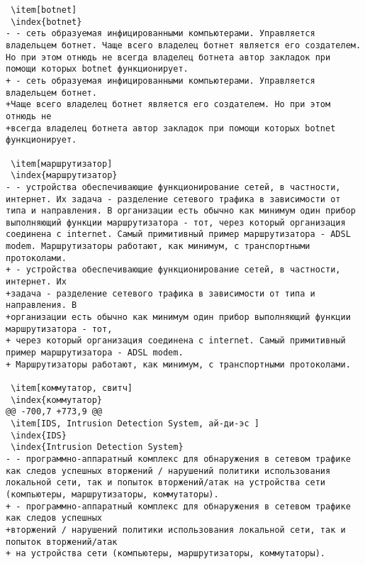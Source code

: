 \begin{verbatim}
 \item[botnet]
 \index{botnet}
- - сеть образуемая инфицированными компьютерами. Управляется владельцем ботнет. Чаще всего владелец ботнет является его создателем. Но при этом отнюдь не всегда владелец ботнета автор закладок при помощи которых botnet функционирует.
+ - сеть образуемая инфицированными компьютерами. Управляется владельцем ботнет.
+Чаще всего владелец ботнет является его создателем. Но при этом отнюдь не
+всегда владелец ботнета автор закладок при помощи которых botnet функционирует.

 \item[маршрутизатор]
 \index{маршрутизатор}
- - устройства обеспечивающие функционирование сетей, в частности, интернет. Их задача - разделение сетевого трафика в зависимости от типа и направления. В организации есть обычно как минимум один прибор выполняющий функции маршрутизатора - тот, через который организация соединена с internet. Самый примитивный пример маршрутизатора - ADSL modem. Маршрутизаторы работают, как минимум, с транспортными протоколами.
+ - устройства обеспечивающие функционирование сетей, в частности, интернет. Их
+задача - разделение сетевого трафика в зависимости от типа и направления. В
+организации есть обычно как минимум один прибор выполняющий функции маршрутизатора - тот,
+ через который организация соединена с internet. Самый примитивный пример маршрутизатора - ADSL modem.
+ Маршрутизаторы работают, как минимум, с транспортными протоколами.

 \item[коммутатор, свитч]
 \index{коммутатор}
@@ -700,7 +773,9 @@
 \item[IDS, Intrusion Detection System, ай-ди-эс ]
 \index{IDS}
 \index{Intrusion Detection System}
- - программно-аппаратный комплекс для обнаружения в сетевом трафике как следов успешных вторжений / нарушений политики использования локальной сети, так и попыток вторжений/атак на устройства сети (компьютеры, маршрутизаторы, коммутаторы).
+ - программно-аппаратный комплекс для обнаружения в сетевом трафике как следов успешных
+вторжений / нарушений политики использования локальной сети, так и попыток вторжений/атак
+ на устройства сети (компьютеры, маршрутизаторы, коммутаторы).


\end{verbatim}
